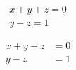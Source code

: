 \documentclass{article}
\begin{document}
\begin{gather}
x +y+z=0\\
y-z=1
\end{gather}

\begin{align}
x + y + z &= 0 \\
y - z &= 1
\end{align}
\end{document}
